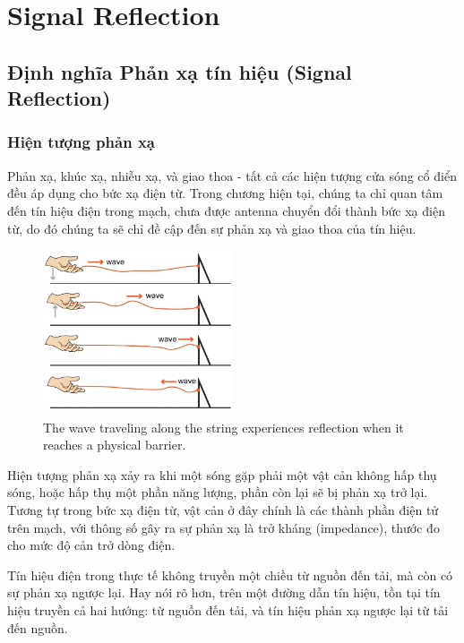 \chapter{Signal Reflection}
    \section{Định nghĩa Phản xạ tín hiệu (Signal Reflection)}
        \subsection{Hiện tượng phản xạ\cite{allaboutcircuits_reflection}\cite{cadence2021reflection}}
            Phản xạ, khúc xạ, nhiễu xạ, và giao thoa - tất cả các hiện tượng cửa sóng cổ điển
            đều áp dụng cho bức xạ điện từ. Trong chương hiện tại, chúng ta chỉ quan tâm đến
            tín hiệu điện trong mạch, chưa được antenna chuyển đổi thành bức xạ điện từ, do đó
            chúng ta sẽ chỉ đề cập đến sự phản xạ và giao thoa của tín hiệu.\par

            \begin{figure}[h]
                \centering
                \includegraphics[width=0.5\textwidth]{figures/reflection_interference.png}
                \caption{The wave traveling along the string experiences reflection when it reaches a physical barrier.}
            \end{figure}

            Hiện tượng phản xạ xảy ra khi một sóng gặp phải một vật cản không hấp thụ sóng, hoặc hấp thụ một phần năng lượng,
            phần còn lại sẽ bị phản xạ trở lại. Tương tự trong bức xạ điện từ, vật cản ở đây chính là các thành phần điện tử trên mạch,
            với thông số gây ra sự phản xạ là trở kháng (impedance), thước đo cho mức độ cản trở dòng điện.

            Tín hiệu điện trong thực tế không truyền một chiều từ nguồn đến tải,
            mà còn có sự phản xạ ngược lại. Hay nói rõ hơn, trên một đường dẫn tín hiệu,
            tồn tại tín hiệu truyền cả hai hướng: từ nguồn đến tải, và tín hiệu phản xạ ngược lại từ tải đến nguồn.\par

